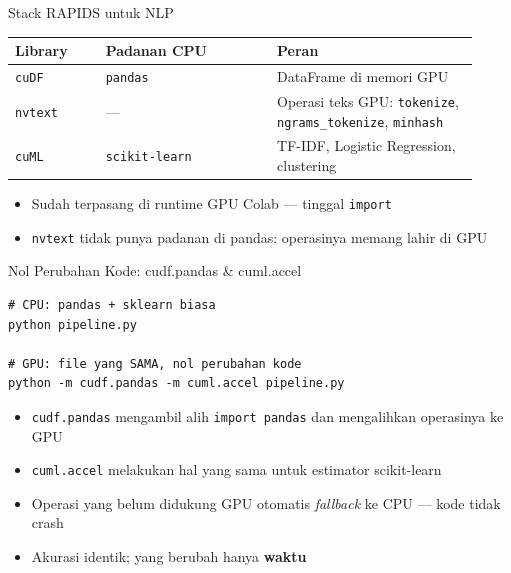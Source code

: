\documentclass[aspectratio=169,t]{beamer}
\begin{document}
\begin{frame}{Stack RAPIDS untuk NLP}
  \begin{center}
  \renewcommand{\arraystretch}{1.3}
  {\footnotesize
  \begin{tabular}{@{}p{0.18\linewidth}p{0.34\linewidth}p{0.40\linewidth}@{}}
    \toprule
    \rowcolor{nvcard!50}
    \textbf{Library} & \textbf{Padanan CPU} & \textbf{Peran} \\
    \midrule
    \texttt{cuDF} & \texttt{pandas} & DataFrame di memori GPU \\
    \texttt{nvtext} & --- & Operasi teks GPU: \texttt{tokenize}, \texttt{ngrams\_tokenize}, \texttt{minhash} \\
    \texttt{cuML} & \texttt{scikit-learn} & TF-IDF, Logistic Regression, clustering \\
    \bottomrule
  \end{tabular}%
  }
  \end{center}
  \vspace{0.8em}
  \begin{itemize}
    \footnotesize
    \item Sudah terpasang di runtime GPU Colab --- tinggal \texttt{import}
    \item \texttt{nvtext} tidak punya padanan di pandas: operasinya memang lahir di GPU
  \end{itemize}
\end{frame}

\begin{frame}[fragile]{Nol Perubahan Kode: cudf.pandas \& cuml.accel}
  \begin{lstlisting}
# CPU: pandas + sklearn biasa
python pipeline.py

# GPU: file yang SAMA, nol perubahan kode
python -m cudf.pandas -m cuml.accel pipeline.py
  \end{lstlisting}
  \vspace{0.4em}
  \begin{itemize}
    \footnotesize
    \item \texttt{cudf.pandas} mengambil alih \texttt{import pandas} dan mengalihkan operasinya ke GPU
    \item \texttt{cuml.accel} melakukan hal yang sama untuk estimator scikit-learn
    \item Operasi yang belum didukung GPU otomatis \emph{fallback} ke CPU --- kode tidak crash
    \item Akurasi identik; yang berubah hanya \textbf{waktu}
  \end{itemize}
\end{frame}
\end{document}
